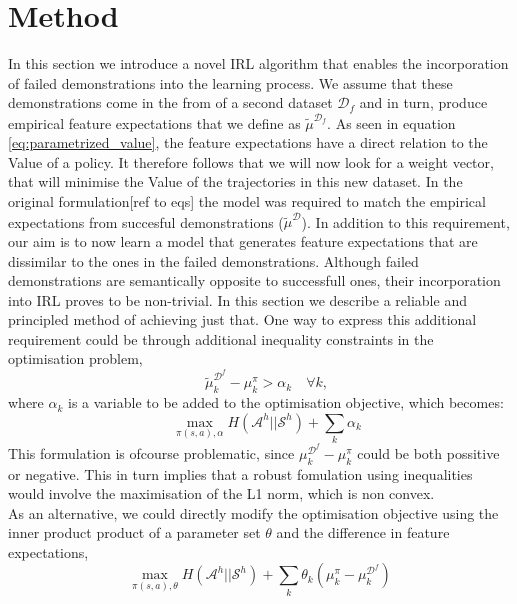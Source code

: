 \documentclass[letterpaper]{article}
\begin{document}
\section{Method}
	In this section we introduce a novel IRL algorithm that enables the incorporation of failed demonstrations into the learning process. We assume that these demonstrations come in the from of a second dataset $\mathcal{D}_f$ and in turn, produce empirical feature expectations that we define as $\widetilde{\mu}^{\mathcal{D}_f}$. As seen in equation \eqref{eq:parametrized_value}, the feature expectations have a direct relation to the Value of a policy. It therefore follows that we will now look for a weight vector, that will minimise the Value of the trajectories in this new dataset.
	In the original formulation[ref to eqs] the model was required to match the empirical expectations from succesful demonstrations ($\widetilde{\mu}^{\mathcal{D}}$). In addition to this requirement, 
	our aim is to now learn a model that generates feature expectations that are dissimilar to the ones in the failed demonstrations. Although failed demonstrations are semantically opposite to successfull ones, their incorporation into IRL proves to be non-trivial. In this section we describe a reliable and principled method of achieving just that.
	One way to express this additional requirement could be through additional inequality constraints in the optimisation problem,
	\begin{equation}
		\quad\widetilde{\mu}^{\mathcal{D}^f}_k  - \mu^{\pi}_k > \alpha_k \quad\forall k,
	\end{equation} 
	where $\alpha_k$ is a variable to be added to the optimisation objective, which becomes:
	\begin{equation}
		\quad\max\limits_{\pi(s,a),\alpha} H(\mathcal{A}^h||\mathcal{S}^h) + \sum_k \alpha_k
	\end{equation}
	This formulation is ofcourse problematic, since $\mu^{\mathcal{D}^f}_k  - \mu^{\pi}_k$ could be both possitive or negative. This in turn implies that a robust fomulation using inequalities 
	would involve the maximisation of the L1 norm, which is non convex.\\
	As an alternative, we could directly modify the optimisation objective using the inner product product of a parameter set $\theta$ and the difference in feature expectations,
	\begin{equation}
		\max\limits_{\pi(s,a),\theta} H(\mathcal{A}^h||\mathcal{S}^h) + \sum_k \theta_k (\mu^{\pi}_k - \mu^{\mathcal{D}^f}_k)
	\end{equation}
\end{document}
